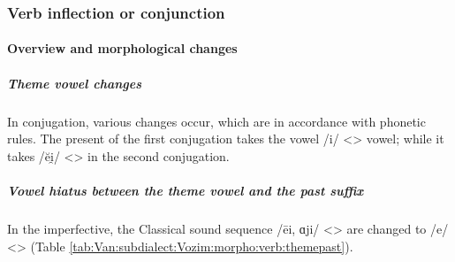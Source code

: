 \subsubsection{Verb inflection or conjunction}

\paragraph{Overview and morphological changes}
\subparagraph{Theme vowel changes}
In conjugation, various changes occur, which are in accordance with phonetic rules. The present of the first conjugation takes the vowel /i/ <> vowel; while it takes /ĕi̯/ <> in the second conjugation. 


\subparagraph{Vowel hiatus between the theme vowel and the past suffix}

In the imperfective, the Classical sound sequence /ēi, ɑji/ <> are changed to /e/ <> (Table \ref{tab:Van:subdialect:Vozim:morpho:verb:themepast}). 


